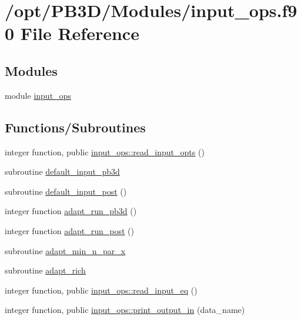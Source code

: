 \hypertarget{input__ops_8f90}{}\section{/opt/\+P\+B3\+D/\+Modules/input\+\_\+ops.f90 File Reference}
\label{input__ops_8f90}
\subsection*{Modules}
\begin{DoxyCompactItemize}
\item 
module \hyperlink{namespaceinput__ops}{input\+\_\+ops}
\end{DoxyCompactItemize}
\subsection*{Functions/\+Subroutines}
\begin{DoxyCompactItemize}
\item 
integer function, public \hyperlink{namespaceinput__ops_a434acca4f59f9dc1d91e04f846133684}{input\+\_\+ops\+::read\+\_\+input\+\_\+opts} ()
\item 
subroutine \hyperlink{input__ops_8f90_a5137b6d81dcbf50b3eb6a000f6b8d2b8}{default\+\_\+input\+\_\+pb3d}
\item 
subroutine \hyperlink{input__ops_8f90_a45cd1d003ad2ab71d12f71492935b2bb}{default\+\_\+input\+\_\+post} ()
\item 
integer function \hyperlink{input__ops_8f90_a4f2af8cdda395ccda6a1adea6c1d578c}{adapt\+\_\+run\+\_\+pb3d} ()
\item 
integer function \hyperlink{input__ops_8f90_a0ba5a762c885daaf5fcc2c60ab81c535}{adapt\+\_\+run\+\_\+post} ()
\item 
subroutine \hyperlink{input__ops_8f90_a911791dfa1bc69e9c2e00488d0a5d60b}{adapt\+\_\+min\+\_\+n\+\_\+par\+\_\+x}
\item 
subroutine \hyperlink{input__ops_8f90_ab580aa4852afcd4a9de50b1b98de14cb}{adapt\+\_\+rich}
\item 
integer function, public \hyperlink{namespaceinput__ops_a577c897cc266961eb40bb5ef747fa077}{input\+\_\+ops\+::read\+\_\+input\+\_\+eq} ()
\item 
integer function, public \hyperlink{namespaceinput__ops_a84ec7b3833da80ebb36ae0d5ff1a9e0a}{input\+\_\+ops\+::print\+\_\+output\+\_\+in} (data\+\_\+name)
\end{DoxyCompactItemize}



